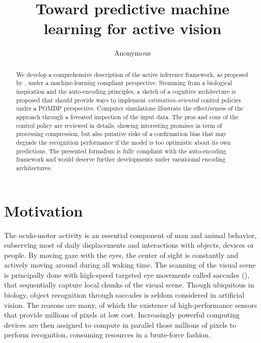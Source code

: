 \documentclass{article} %
\title{Toward predictive machine learning for active vision}
\author{Anonymous
}
\begin{document}
\maketitle

\begin{abstract}
We develop a comprehensive description of the active inference framework, as proposed by \cite{friston2010free}, under a machine-learning compliant perspective. Stemming from a biological inspiration and the auto-encoding principles, a sketch of a cognitive architecture is proposed that should provide ways to implement \emph{estimation-oriented} control policies under a POMDP perspective. 
Computer simulations illustrate the effectiveness of the approach through a foveated inspection of the input data.
The pros and cons of the control policy are reviewed in details, showing interesting promises in term of processing compression, but also putative risks of a confirmation bias that may degrade the recognition performance if the model is too optimistic about its own predictions. The presented formalism is fully compliant with the auto-encoding framework and would deserve further developments under variational encoding architectures.
\end{abstract}

\section{Motivation}

	The oculo-motor activity is an essential component of man and animal behavior, subserving most of daily displacements and interactions with objects, devices or people. By moving gaze with the eyes, the center of sight is constantly and actively moving around during all waking time.  %
	The scanning of the visual scene is principally done with high-speed targeted eye movements called saccades (\cite{yarbus1967eye}), that sequentially capture local chunks of the visual scene. 
	Though ubiquitous in biology, object recognition through saccades is seldom considered in artificial vision. The reasons are many, of which the existence of high-performance sensors that provide millions of pixels at low cost. %
	Increasingly powerful computing devices are then assigned to compute in parallel those millions of pixels to perform recognition, consuming resources in a brute-force fashion. 
	
\end{document}
